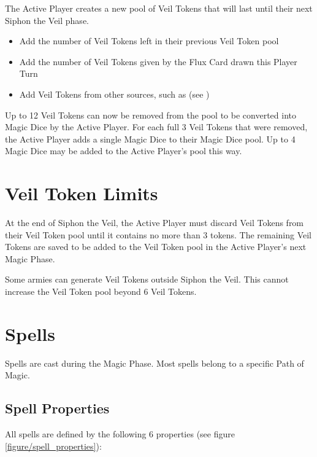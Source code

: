The Active Player creates a new pool of Veil Tokens that will last until their next Siphon the Veil phase.
\begin{itemize}
\item Add the number of Veil Tokens left in their previous Veil Token pool
\item Add the number of Veil Tokens given by the Flux Card drawn this Player Turn
\item Add Veil Tokens from other sources, such as \channel{} (see )
\end{itemize}

 Up to 12 Veil Tokens can now be removed from the pool to be converted into Magic Dice by the Active Player. For each full 3 Veil Tokens that were removed, the Active Player adds a single Magic Dice to their Magic Dice pool. Up to 4 Magic Dice may be added to the Active Player's pool this way.

\section{Veil Token Limits}
\label{veil_token_limits}

At the end of Siphon the Veil, the Active Player must discard Veil Tokens from their Veil Token pool until it contains no more than 3 tokens. The remaining Veil Tokens are saved to be added to the Veil Token pool in the Active Player's next Magic Phase.

Some armies can generate Veil Tokens outside Siphon the Veil. This cannot increase the Veil Token pool beyond 6 Veil Tokens.

\section{Spells}
\label{spells}

Spells are cast during the Magic Phase. Most spells belong to a specific Path of Magic.

\newpage
\subsection{Spell Properties}
\label{spell_properties}

All spells are defined by the following 6 properties (see figure \ref{figure/spell_properties}):

